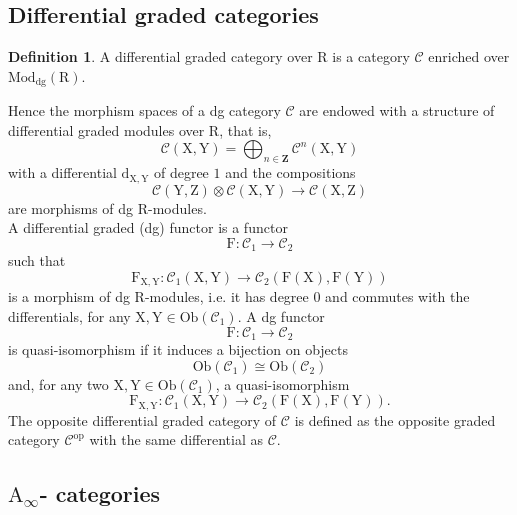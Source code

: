 \documentclass{article}
\theoremstyle{plain}
\theoremstyle{definition}
\newtheorem{definition}[theorem]{Definition}
\theoremstyle{remark}
\newcommand{\mr}{\mathrm}
\newcommand{\Aa}{\mr{A}_{\infty}}
\newcommand{\Z}{\mathbf Z}
\newcommand{\3}{\vspace{3mm}}
\newcommand{\2}{\vspace{2mm}}
\newcommand{\1}{\vspace{1mm}}
\begin{document}
\subsection{Differential graded categories}
\begin{definition}
A differential graded category over $\mr{R}$ is a category $\mathcal{C}$  enriched over $\mr{Mod}_\mr{dg}(\mr{R})$.
\end{definition}

Hence the morphism spaces of a dg category $\mathcal{C}$ are endowed with a structure of differential graded modules over $\mr{R}$, that is, $$\mathcal{C}(\mr{X,Y})=\bigoplus_{n\in \Z}\mathcal{C}^{n}(\mr{X,Y})$$ with a differential $\mr{d}_\mr{X,Y}$ of degree $1$ and the compositions $$\mathcal{C}(\mr{Y,Z})\otimes \mathcal{C}(\mr{X,Y})\to \mathcal{C}(\mr{X,Z})$$ are morphisms of dg $\mr{R}$-modules.\\
A differential graded (dg) functor is a functor $$\mr{F}:\mathcal{C}_1\to \mathcal{C}_2$$ such that $$\mr{F}_{\mr{X},\mr{Y}}:\mathcal{C}_1(\mr{X},\mr{Y})\to \mathcal{C}_2(\mr{F}(\mr{X}),\mr{F}(\mr{Y}))$$ is a morphism of dg $\mr{R}$-modules, i.e. it has degree $0$ and commutes with the differentials, for any $\mr{X},\mr{Y} \in \mr{Ob}(\mathcal{C}_1)$. A dg functor $$\mr{F}:\mathcal{C}_1\to \mathcal{C}_2$$ is quasi-isomorphism if it induces a bijection on objects $$\mr{Ob}(\mathcal{C}_1)\cong \mr{Ob}(\mathcal{C}_2)$$ and, for any two $\mr{X,Y}\in \mr{Ob}(\mathcal{C}_1)$, a quasi-isomorphism $$\mr{F}_{\mr{X},\mr{Y}}:\mathcal{C}_1(\mr{X},\mr{Y})\to \mathcal{C}_2(\mr{F}(\mr{X}),\mr{F}(\mr{Y})).$$
The opposite differential graded category of $\mathcal{C}$ is defined as the opposite graded category $\mathcal{C}^\mr{op}$ with the same differential as $\mathcal{C}$.

\subsection{\texorpdfstring{ $\Aa$-}- categories}
\end{document}
